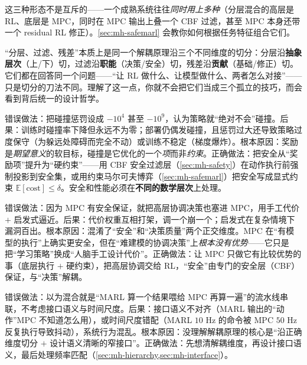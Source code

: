 \noindent 这三种形态不是互斥的——一个成熟系统往往\emph{同时用上多种}（分层混合的高层是 RL、底层是 MPC，同时在 MPC 输出上叠一个 CBF 过滤，甚至 MPC 本身还带一个 residual RL 修正）。\cref{sec:mh-safemarl} 会教你如何根据任务特征组合它们。

\begin{insight}[分层、过滤、残差是同一原理的三种刀法]
“分层、过滤、残差”本质上是同一个解耦原理沿三个不同维度的切分：分层沿\textbf{抽象层次}（上/下）切，过滤沿\textbf{职能}（决策/安全）切，残差沿\textbf{贡献}（基础/修正）切。它们都在回答同一个问题——“让 RL 做什么、让模型做什么、两者怎么对接”——只是切分的刀法不同。理解了这一点，你就不会把它们当成三个孤立的技巧，而会看到背后统一的设计哲学。
\end{insight}

\begin{pitfall}
错误做法：把碰撞惩罚设成 $-10^4$ 甚至 $-10^9$，认为策略就“绝对不会”碰撞。后果：训练时碰撞率下降但永远不为零；部署仍偶发碰撞，且惩罚过大还导致策略过度保守（为躲远处障碍而完全不动）或训练不稳定（梯度爆炸）。根本原因：奖励是\emph{期望意义}的软目标，碰撞是它优化的一个\emph{项}而非\emph{约束}。正确做法：把安全从“奖励项”提升为“硬约束”——用 CBF 安全过滤层（\cref{sec:mh-safety}）在动作执行前强制投影到安全集，或用约束马尔可夫博弈（\cref{sec:mh-safemarl}）把安全写成显式约束 $\mathbb{E}[\text{cost}]\le\delta$。安全和性能必须在\textbf{不同的数学层次}上处理。
\end{pitfall}

\begin{pitfall}
错误做法：因为 MPC 有安全保证，就把高层协调决策也塞进 MPC，用手工代价 $+$ 启发式逼近。后果：代价权重互相打架，调一个崩一个；启发式在复杂情境下漏洞百出。根本原因：混淆了“安全”和“决策质量”两个正交维度。MPC 在“有模型的执行”上确实更安全，但在“难建模的协调决策”上\emph{根本没有优势}——它只是把“学习策略”换成“人脑手工设计代价”。正确做法：让 MPC 只做它有比较优势的事（底层执行 $+$ 硬约束），把高层协调交给 RL，“安全”由专门的安全层（CBF）保证，与“决策”解耦。
\end{pitfall}

\begin{pitfall}
错误做法：以为混合就是“MARL 算一个结果喂给 MPC 再算一遍”的流水线串联，不考虑接口语义与时间尺度。后果：接口语义不对齐（MARL 输出的“动作”MPC 不知道怎么用），或时间尺度错配（MARL $10$ Hz 的命令被 MPC $50$ Hz 反复执行导致抖动），系统行为混乱。根本原因：没理解解耦原理的核心是“沿正确维度切分 $+$ 设计语义清晰的窄接口”。正确做法：先想清解耦维度，再设计接口语义，最后处理频率匹配（\cref{sec:mh-hierarchy,sec:mh-interface}）。
\end{pitfall}

